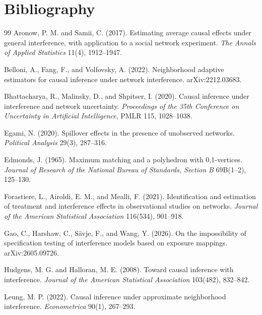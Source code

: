 \documentclass[11pt]{article}
\theoremstyle{definition}
\theoremstyle{plain}
\theoremstyle{remark}
\begin{document}
\section*{Bibliography}
\begin{thebibliography}{99}
Aronow, P. M. and Samii, C. (2017).
Estimating average causal effects under general interference, with application to a social network experiment.
\emph{The Annals of Applied Statistics} 11(4), 1912--1947.

Belloni, A., Fang, F., and Volfovsky, A. (2022).
Neighborhood adaptive estimators for causal inference under network interference.
arXiv:2212.03683.

Bhattacharya, R., Malinsky, D., and Shpitser, I. (2020).
Causal inference under interference and network uncertainty.
\emph{Proceedings of the 35th Conference on Uncertainty in Artificial Intelligence}, PMLR 115, 1028--1038.

Egami, N. (2020).
Spillover effects in the presence of unobserved networks.
\emph{Political Analysis} 29(3), 287--316.

Edmonds, J. (1965).
Maximum matching and a polyhedron with 0,1-vertices.
\emph{Journal of Research of the National Bureau of Standards, Section B} 69B(1--2), 125--130.

Forastiere, L., Airoldi, E. M., and Mealli, F. (2021).
Identification and estimation of treatment and interference effects in observational studies on networks.
\emph{Journal of the American Statistical Association} 116(534), 901--918.

Gao, C., Harshaw, C., Sävje, F., and Wang, Y. (2026).
On the impossibility of specification testing of interference models based on exposure mappings.
arXiv:2605.09726.

Hudgens, M. G. and Halloran, M. E. (2008).
Toward causal inference with interference.
\emph{Journal of the American Statistical Association} 103(482), 832--842.

Leung, M. P. (2022).
Causal inference under approximate neighborhood interference.
\emph{Econometrica} 90(1), 267--293.


\end{thebibliography}
\end{document}
